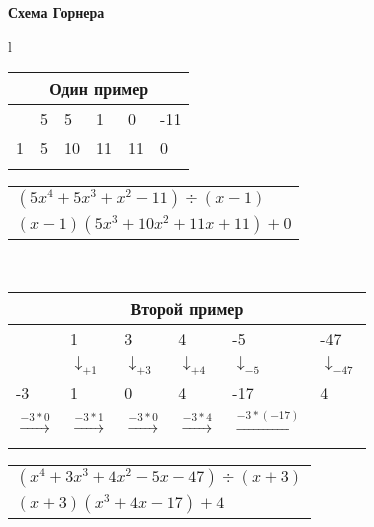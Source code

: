 \textbf{Схема Горнера}\\
\begin{tabular}{l}

\begin{tabular}{|l|l|l|l|l|l|}
	\multicolumn{6}{c}{Один пример} \\
	\hline
	&    
	5 &
	5 &
	1 &
	0 &
	-11 
	\\ 
	\hline
	1& 
	5 &
	10 &
	11 &
	11 &
	0\\
	\hline
	\multicolumn{1}{c}{}
\end{tabular}
\begin{tabular}{l}
	$(5x^4 + 5x^3 + x^2 -11) \div (x - 1) $ \\
	$(x - 1)(5x^3 + 10 x^2 + 11 x + 11) + 0$
\end{tabular}
\\
\begin{tabular}{|l|l|l|l|l|l|}
	\multicolumn{6}{c}{Второй пример} \\
	\hline   
	&
	1 &
	3 &
	4 &
	-5 &
	-47 
	\\
	
	
	\hline
	&
	$\downarrow_{+1}$ &
	$\downarrow_{+3}$ &
	$\downarrow_{+4}$ &
	$\downarrow_{-5}$ &
	$\downarrow_{-47}$\\
	 
	\hline
	-3& 
	1 &
	0 &
	4 &
	-17 &
	4\\
	
	\hline
	
	
	
	$\xrightarrow[]{-3 * 0}$ &
	$\xrightarrow[]{-3 * 1}$  &
	$\xrightarrow[]{-3 * 0}$  &
	$\xrightarrow[]{-3 * 4}$  &
	$\xrightarrow[]{-3 * (-17)}$
	&
	\\ 
	\hline
	
\end{tabular}
\begin{tabular}{l}
	$(x^4 + 3x^3 + 4x^2 - 5x -47) \div (x + 3) $ \\
	$(x + 3)(x^3 + 4x -17) + 4$
\end{tabular}

\end{tabular}


